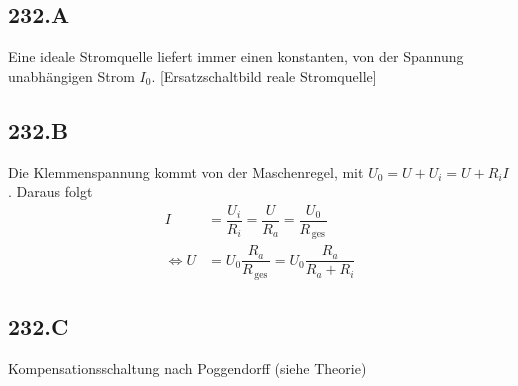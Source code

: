 \documentclass[a4paper,12pt]{article}
\numberwithin{equation}{section}
\begin{document}
\subsection{232.A}
Eine ideale Stromquelle liefert immer einen konstanten, von der Spannung unabhängigen Strom $I_0$. [Ersatzschaltbild reale Stromquelle]

\subsection{232.B}
Die Klemmenspannung kommt von der Maschenregel, mit $U_0=U+U_i=U+R_iI$. Daraus folgt
\begin{align} 
        I&=\dfrac{U_i}{R_i}=\dfrac{U}{R_a}=\dfrac{U_0}{R_{\,\text{ges}\,}}\\
        \Leftrightarrow U&=U_0\dfrac{R_a}{R_{\,\text{ges}\,}}=U_0\dfrac{R_a}{R_a+R_i}
\end{align} 

\subsection{232.C}
Kompensationsschaltung nach Poggendorff (siehe Theorie)

\end{document}
